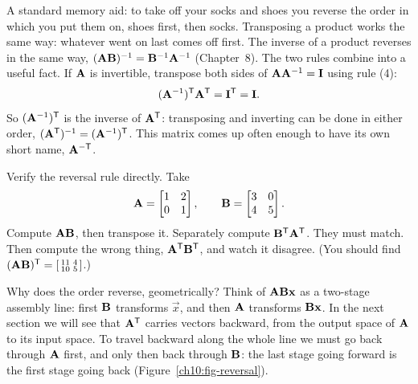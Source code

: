 A standard memory aid: to take off your socks and shoes you reverse the order in which you put
them on, shoes first, then socks. Transposing a product works the same way: whatever went on last
comes off first. The inverse of a product reverses in the same way,
$(\mathbf{A}\mathbf{B})^{-1} = \mathbf{B}^{-1}\mathbf{A}^{-1}$ (Chapter~8). The two rules combine into a useful
fact. If $\mathbf{A}$ is invertible, transpose both sides of $\mathbf{A}\mathbf{A}^{-1}=\mathbf{I}$ using rule (4):
\[
  (\mathbf{A}^{-1})^{\mathsf{T}}\mathbf{A}^{\mathsf{T}} = \mathbf{I}^{\mathsf{T}} = \mathbf{I}.
\]
So $(\mathbf{A}^{-1})^{\mathsf{T}}$ is the inverse of $\mathbf{A}^{\mathsf{T}}$: transposing and inverting can be done in
either order, $(\mathbf{A}^{\mathsf{T}})^{-1} = (\mathbf{A}^{-1})^{\mathsf{T}}$. This matrix comes up often enough to have its
own short name, $\mathbf{A}^{-\mathsf{T}}$.

\begin{labbox}
Verify the reversal rule directly. Take
\[
  \mathbf{A}=\begin{bmatrix}1&2\\0&1\end{bmatrix},\qquad
  \mathbf{B}=\begin{bmatrix}3&0\\4&5\end{bmatrix}.
\]
Compute $\mathbf{A}\mathbf{B}$, then transpose it. Separately compute $\mathbf{B}^{\mathsf{T}}\mathbf{A}^{\mathsf{T}}$. They must
match. Then compute the wrong thing, $\mathbf{A}^{\mathsf{T}}\mathbf{B}^{\mathsf{T}}$, and watch it disagree. (You should find
$(\mathbf{A}\mathbf{B})^{\mathsf{T}} = \begin{bsmallmatrix}11&4\\10&5\end{bsmallmatrix}$.)
\end{labbox}

Why does the order reverse, geometrically? Think of $\mathbf{A}\mathbf{B}\mathbf{x}$ as a two-stage assembly
line: first $\mathbf{B}$ transforms $\vec{x}$, and then $\mathbf{A}$ transforms $\mathbf{B}\mathbf{x}$.
In the next section we will see that $\mathbf{A}^{\mathsf{T}}$ carries vectors backward, from the output space of
$\mathbf{A}$ to its input space. To travel backward along the whole line we must go back through
$\mathbf{A}$ first, and only then back through $\mathbf{B}$: the last stage going forward is the first
stage going back (Figure~\ref{ch10:fig-reversal}).


